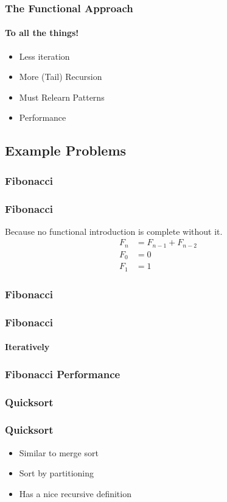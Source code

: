 \documentclass[english]{beamer}
\begin{document}
\begin{frame}
\frametitle{The Functional Approach}
\framesubtitle{To all the things!}
\begin{itemize}
\item<1->{Less iteration} %
\item<2->{More (Tail) Recursion} %
\item<3->{Must Relearn Patterns}
\item<4->{Performance}
\end{itemize}
\end{frame}

\subsection{Example Problems}
\subsubsection{Fibonacci}
\begin{frame}
\frametitle{Fibonacci}
Because no functional introduction is complete without it.
\begin{align*}
F_n &= F_{n-1} + F_{n-2} \\
F_0 &= 0 \\
F_1 &= 1
\end{align*}
\end{frame}

\begin{frame}[fragile]
\frametitle{Fibonacci}

\end{frame}

\begin{frame}[fragile]
\frametitle{Fibonacci}
\framesubtitle{Iteratively}

\end{frame}

\begin{frame}[fragile]
\frametitle{Fibonacci Performance}

\end{frame}

\subsubsection{Quicksort}
\begin{frame}
\frametitle{Quicksort}
\begin{itemize}
\item{Similar to merge sort}
\item{Sort by partitioning}
\item{Has a nice recursive definition} %
\end{itemize}
\end{frame}
\end{document}
